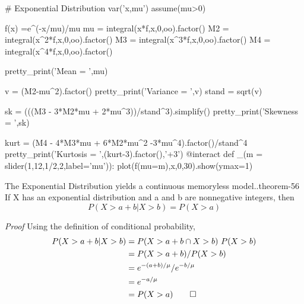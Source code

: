 \documentclass[10pt,]{book}
\makeatletter
\renewcommand*{\proofname}{Proof}
\renewenvironment{proof}[1][\proofname]{\par
  \pushQED{\qed}%
  \normalfont \topsep6\p@\@plus6\p@\relax
  \trivlist
  \item\relax
    {\itshape
    #1\@addpunct{.}}\hspace\labelsep\ignorespaces
}{%
  \popQED\endtrivlist\@endpefalse
}
\numberwithin{equation}{section}
\makeatother
\begin{document}
%
\par
\hypertarget{p-975}{}%
\leavevmode%
\begin{sageinput}
# Exponential Distribution
var('x,mu')
assume(mu>0)

f(x) =e^(-x/mu)/mu
mu = integral(x*f,x,0,oo).factor()
M2 = integral(x^2*f,x,0,oo).factor()
M3 = integral(x^3*f,x,0,oo).factor()
M4 = integral(x^4*f,x,0,oo).factor()

pretty_print('Mean = ',mu)

v = (M2-mu^2).factor()
pretty_print('Variance = ',v)
stand = sqrt(v)

sk = (((M3 - 3*M2*mu + 2*mu^3))/stand^3).simplify()
pretty_print('Skewness = ',sk)

kurt = (M4 - 4*M3*mu + 6*M2*mu^2 -3*mu^4).factor()/stand^4
pretty_print('Kurtosis = ',(kurt-3).factor(),'+3')
@interact
def _(m = slider(1,12,1/2,2,label='mu')):
    plot(f(mu=m),x,0,30).show(ymax=1)
\end{sageinput}
%
\par
\hypertarget{p-976}{}%
\begin{theorem}{The Exponential Distribution yields a continuous memoryless model..}{}{theorem-56}%
\hypertarget{p-977}{}%
If X has an exponential distribution and a and b are nonnegative integers, then%
\begin{equation*}
P( X > a + b | X > b ) = P( X > a)
\end{equation*}
%
\end{theorem}
\begin{proof}\hypertarget{proof-58}{}
\hypertarget{p-978}{}%
Using the definition of conditional probability,%
\begin{align*}
P( X > a + b | X > b ) & = P( X > a + b \cap X > b ) \ P( X > b)\\
& = P( X > a + b ) / P( X > b)\\
& = e^{-(a+b)/ \mu} / e^{-b / \mu}\\
& = e^{-a/ \mu}\\
& = P(X > a)\qedhere
\end{align*}
%
\end{proof}
%
%
%
\typeout{************************************************}
\typeout{************************************************}
%
\end{document}
